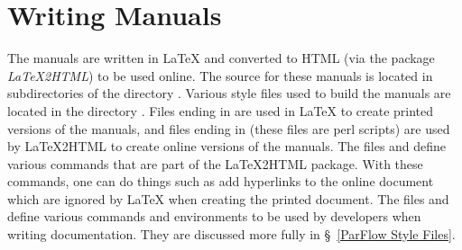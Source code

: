 \section{Writing Manuals}
\label{Writing Manuals}

The \parflow{} manuals are written in LaTeX and converted to HTML
(via the package {\em LaTeX2HTML}) to be used online.
The source for these manuals is located in subdirectories of the
directory .
Various style files used to build the \parflow{} manuals are located
in the directory .
Files ending in  are used in LaTeX to create printed
versions of the manuals, and files ending in  (these files
are perl scripts) are used by LaTeX2HTML to create online versions
of the manuals.
The files  and 
define various commands that are part of the LaTeX2HTML package.
With these commands, one can do things such as add hyperlinks to
the online document which are ignored by LaTeX when creating
the printed document.
The files  and 
define various commands and environments to be used by \parflow{}
developers when writing documentation.
They are discussed more fully in \S~\ref{ParFlow Style Files}.

